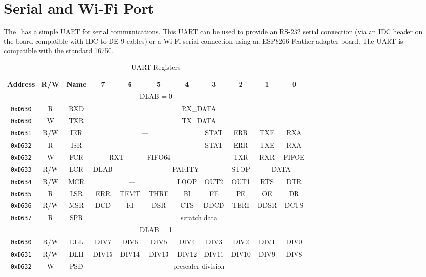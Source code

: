 \chapter{Serial and Wi-Fi Port}

The \jr\ has a simple UART for serial communications. This UART can be used to provide an RS-232 serial connection (via an IDC header on the board compatible with IDC to DE-9 cables) or a Wi-Fi serial connection using an ESP8266 Feather adapter board. The UART is compatible with the standard 16750.

\begin{table}[ht]
    \begin{center}
        \begin{tabular}{|c|c|c|c|c|c|c|c|c|c|c|} \hline
            Address & R/W & Name & 7 & 6 & 5 & 4 & 3 & 2 & 1 & 0 \\\hline\hline
            \multicolumn{11}{|c|}{DLAB = 0} \\ \hline
            \verb+0xD630+ & R & RXD & \multicolumn{8}{|c|}{RX\_DATA} \\ \hline
            \verb+0xD630+ & W & TXR & \multicolumn{8}{|c|}{TX\_DATA} \\ \hline
            \verb+0xD631+ & R/W & IER & \multicolumn{4}{|c|}{---} & STAT & ERR & TXE & RXA \\ \hline
            \verb+0xD632+ & R & ISR & \multicolumn{4}{|c|}{---} & STAT & ERR & TXE & RXA \\ \hline
            \verb+0xD632+ & W & FCR & \multicolumn{2}{|c|}{RXT} & FIFO64 & --- & --- & TXR & RXR & FIFOE \\ \hline
            \verb+0xD633+ & R/W & LCR & DLAB & --- & \multicolumn{3}{|c|}{PARITY} & STOP & \multicolumn{2}{|c|}{DATA} \\ \hline
            \verb+0xD634+ & R/W & MCR & \multicolumn{3}{|c|}{---} & LOOP & OUT2 & OUT1 & RTS & DTR \\ \hline
            \verb+0xD635+ & R & LSR & ERR & TEMT & THRE & BI & FE & PE & OE & DR \\ \hline
            \verb+0xD636+ & R/W & MSR & DCD & RI & DSR & CTS & DDCD & TERI & DDSR & DCTS \\ \hline
            \verb+0xD637+ & R & SPR & \multicolumn{8}{|c|}{scratch data} \\ \hline\hline

            \multicolumn{11}{|c|}{DLAB = 1} \\ \hline
            \verb+0xD630+ & R/W & DLL & DIV7 & DIV6 & DIV5 & DIV4 & DIV3 & DIV2 & DIV1 & DIV0 \\ \hline
            \verb+0xD631+ & R/W & DLH & DIV15 & DIV14 & DIV13 & DIV12 & DIV11 & DIV10 & DIV9 & DIV8 \\ \hline
            \verb+0xD632+ & W & PSD & \multicolumn{8}{|c|}{prescaler division} \\ \hline
        \end{tabular}
    \end{center}
    \caption{UART Registers}
    \label{tab:uart_reg}
\end{table}

